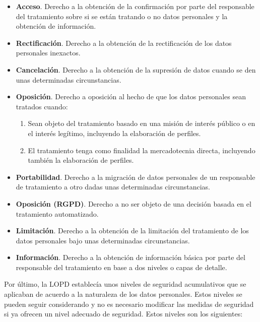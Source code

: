 \begin{itemize}
    \item \textbf{Acceso}. Derecho a la obtención de la confirmación por parte del responsable del tratamiento sobre si se están tratando o no datos personales y la obtención de información.
    
    \item \textbf{Rectificación}. Derecho a la obtención de la rectificación de los datos personales inexactos.
    
    \item \textbf{Cancelación}. Derecho a la obtención de la supresión de datos cuando se den unas determinadas circunstancias.
    
    \item \textbf{Oposición}. Derecho a oposición al hecho de que los datos personales sean tratados cuando: 
    
        \begin{enumerate}
            \item Sean objeto del tratamiento basado en una misión de interés público o en el interés legítimo, incluyendo la elaboración de perfiles.
            
            \item El tratamiento tenga como finalidad la mercadotecnia directa, incluyendo también la elaboración de perfiles.
        \end{enumerate}

    \item \textbf{Portabilidad}. Derecho a la migración de datos personales de un responsable de tratamiento a otro dadas unas determinadas circunstancias.
    
    \item \textbf{Oposición (\acs{RGPD})}. Derecho a no ser objeto de una decisión basada en el tratamiento automatizado.
    
    \item \textbf{Limitación}. Derecho a la obtención de la limitación del tratamiento de los datos personales bajo unas determinadas circunstancias.
    
    \item \textbf{Información}. Derecho a la obtención de información básica por parte del responsable del tratamiento en base a dos niveles o capas de detalle.
\end{itemize}

Por último, la \acs{LOPD} establecía unos niveles de seguridad acumulativos que se aplicaban de acuerdo a la naturaleza de los datos personales. Estos niveles se pueden seguir considerando y no es necesario modificar las medidas de seguridad si ya ofrecen un nivel adecuado de seguridad. Estos niveles son los siguientes:

